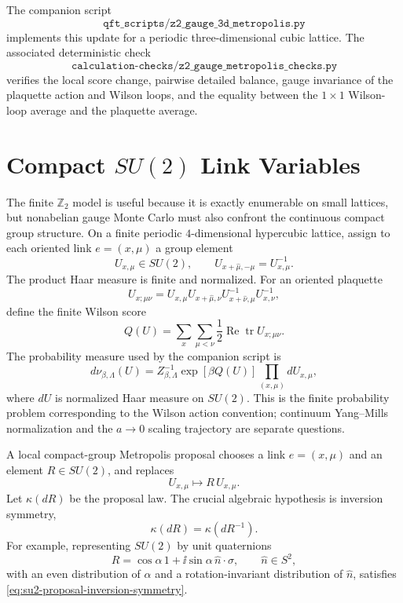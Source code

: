 The companion script
\[
  \texttt{qft\_scripts/z2\_gauge\_3d\_metropolis.py}
\]
implements this update for a periodic three-dimensional cubic lattice.  The
associated deterministic check
\[
  \texttt{calculation-checks/z2\_gauge\_metropolis\_checks.py}
\]
verifies the local score change, pairwise detailed balance, gauge invariance
of the plaquette action and Wilson loops, and the equality between the
\(1\times1\) Wilson-loop average and the plaquette average.

\section{\texorpdfstring{Compact \(SU(2)\) Link Variables}{Compact SU(2) Link Variables}}

The finite \(\mathbb Z_2\) model is useful because it is exactly enumerable
on small lattices, but nonabelian gauge Monte Carlo must also confront the
continuous compact group structure.  On a finite periodic \(4\)-dimensional
hypercubic lattice, assign to each oriented link \(e=(x,\mu)\) a group
element
\[
  U_{x,\mu}\in SU(2),
  \qquad
  U_{x+\hat\mu,-\mu}=U_{x,\mu}^{-1}.
\]
The product Haar measure is finite and normalized.  For an oriented plaquette
\[
  U_{x;\mu\nu}
  =
  U_{x,\mu}U_{x+\hat\mu,\nu}
  U^{-1}_{x+\hat\nu,\mu}U^{-1}_{x,\nu},
\]
define the finite Wilson score
\begin{equation}
  Q(U)
  =
  \sum_{x}\sum_{\mu<\nu}
  \frac12\operatorname{Re}\operatorname{tr}U_{x;\mu\nu}.
  \label{eq:su2-finite-wilson-score}
\end{equation}
The probability measure used by the companion script is
\begin{equation}
  d\nu_{\beta,\Lambda}(U)
  =
  Z_{\beta,\Lambda}^{-1}\exp[\beta Q(U)]
  \prod_{(x,\mu)}dU_{x,\mu},
  \label{eq:su2-finite-wilson-probability}
\end{equation}
where \(dU\) is normalized Haar measure on \(SU(2)\).  This is the finite
probability problem corresponding to the Wilson action convention; continuum
Yang--Mills normalization and the \(a\to0\) scaling trajectory are separate
questions.

A local compact-group Metropolis proposal chooses a link \(e=(x,\mu)\) and an
element \(R\in SU(2)\), and replaces
\[
  U_{x,\mu}\longmapsto R\,U_{x,\mu}.
\]
Let \(\kappa(dR)\) be the proposal law.  The crucial algebraic hypothesis is
inversion symmetry,
\begin{equation}
  \kappa(dR)=\kappa(dR^{-1}).
  \label{eq:su2-proposal-inversion-symmetry}
\end{equation}
For example, representing \(SU(2)\) by unit quaternions
\[
  R=\cos\alpha\,1+\ii\sin\alpha\,\hat n\cdot\sigma,
  \qquad
  \hat n\in S^2,
\]
with an even distribution of \(\alpha\) and a rotation-invariant distribution
of \(\hat n\), satisfies \eqref{eq:su2-proposal-inversion-symmetry}.

